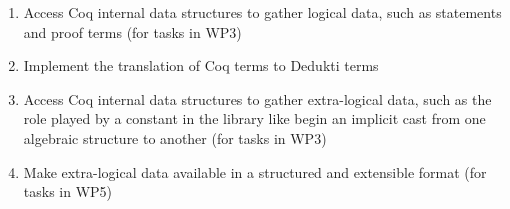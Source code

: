 


\begin{enumerate}
\item Access Coq internal data structures to gather logical data, such as
statements and proof terms (for tasks in WP3)
\item Implement the translation of Coq terms to Dedukti terms
\item Access Coq internal data structures to gather extra-logical data,
such as the role played by a constant in the library like begin an implicit
cast from one algebraic structure to another (for tasks in WP3)
\item Make extra-logical data available in a structured and
  extensible format (for tasks in WP5)
\end{enumerate}



